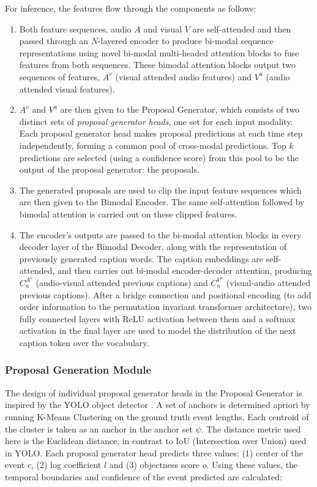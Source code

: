 For inference, the features flow through the components as follows:
\begin{enumerate}
\item Both feature sequences, audio $A$ and visual $V$ are self-attended and then passed
through an $N$-layered encoder to produce bi-modal sequence representations using novel
bi-modal multi-headed attention blocks to fuse features from both sequences. These bimodal
attention blocks output two sequences of features, $A^v$ (visual attended audio features)
and $V^a$ (audio attended visual features).

\item $A^v$ and $V^a$ are then given to the Proposal Generator, which consists of two
distinct sets of \textit{proposal generator heads}, one set for each input modality.
Each proposal generator head makes proposal predictions at each time step independently,
forming a common pool of cross-modal predictions. Top $k$ predictions are selected (using a
confidence score) from this pool to be the output of the proposal generator: the proposals.

\item The generated proposals are used to clip the input feature sequences which are then
given to the Bimodal Encoder. The same self-attention followed by bimodal attention is
carried out on these clipped features.

\item The encoder's outputs are passed to the bi-modal attention blocks in every decoder
layer of the Bimodal Decoder, along with the representation of previously generated caption
words. The caption embeddings are self-attended, and then carries out bi-modal
encoder-decoder attention, producing $C_n^{A^v}$ (audio-visual attended previous captions)
and $C_n^{V^a}$ (visual-audio attended previous captions). After a bridge connection and
positional encoding (to add order information to the permutation invariant transformer
architecture), two fully connected layers with ReLU activation between them and a softmax
activation in the final layer are used to model the distribution of the next caption token 
over the vocabulary.

\end{enumerate}

\subsubsection{Proposal Generation Module}


\par The design of individual proposal generator heads in the Proposal Generator is inspired by 
the YOLO object detector \cite{yolo}. A set of anchors is determined apriori by running 
K-Means Clustering on the ground truth event lengths. Each centroid of the cluster is taken 
as an anchor in the anchor set $\psi$. The distance metric used here is the Euclidean 
distance, in contrast to IoU (Intersection over Union) used in YOLO. Each proposal generator 
head predicts three values: (1) center of the event $c$, (2) log coefficient $l$ and (3) 
objectness score $o$. Using these values, the temporal boundaries and confidence of the event 
predicted are calculated:

